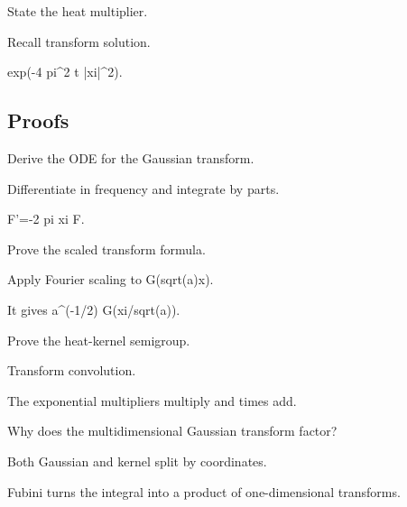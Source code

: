 \begin{exercise}\label{exr:iii12-expand-05}
State the heat multiplier.
\end{exercise}
\begin{hint}
Recall transform solution.
\end{hint}
\begin{solution}
exp(-4 pi\textasciicircum{}2 t |xi|\textasciicircum{}2).
\end{solution}

\subsection*{Proofs}

\begin{exercise}\label{exr:iii12-expand-06}
Derive the ODE for the Gaussian transform.
\end{exercise}
\begin{hint}
Differentiate in frequency and integrate by parts.
\end{hint}
\begin{solution}
F'=-2 pi xi F.
\end{solution}

\begin{exercise}\label{exr:iii12-expand-07}
Prove the scaled transform formula.
\end{exercise}
\begin{hint}
Apply Fourier scaling to G(sqrt(a)x).
\end{hint}
\begin{solution}
It gives a\textasciicircum{}(-1/2) G(xi/sqrt(a)).
\end{solution}

\begin{exercise}\label{exr:iii12-expand-08}
Prove the heat-kernel semigroup.
\end{exercise}
\begin{hint}
Transform convolution.
\end{hint}
\begin{solution}
The exponential multipliers multiply and times add.
\end{solution}

\begin{exercise}\label{exr:iii12-expand-09}
Why does the multidimensional Gaussian transform factor?
\end{exercise}
\begin{hint}
Both Gaussian and kernel split by coordinates.
\end{hint}
\begin{solution}
Fubini turns the integral into a product of one-dimensional transforms.
\end{solution}

